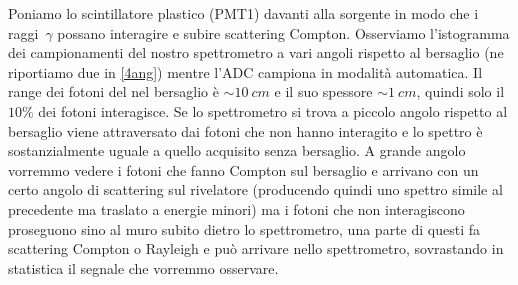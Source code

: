 Poniamo lo scintillatore plastico (PMT1) davanti alla sorgente in modo che i raggi~$\gamma$ possano interagire e subire scattering Compton. Osserviamo l'istogramma dei campionamenti del nostro spettrometro a vari angoli rispetto al bersaglio (ne riportiamo due in \autoref{4ang}) mentre l'ADC campiona in modalità automatica.
Il range dei fotoni del \co\; nel bersaglio è $\sim\SI{10}{cm}$ e il suo spessore $\sim\SI{1}{cm}$, quindi solo il $10\%$ dei fotoni interagisce. 
Se lo spettrometro si trova a piccolo angolo rispetto al bersaglio viene attraversato dai fotoni che non hanno interagito e lo spettro è sostanzialmente uguale a quello acquisito senza bersaglio. A grande angolo vorremmo vedere i fotoni che fanno Compton sul bersaglio e arrivano con un certo angolo di scattering sul rivelatore (producendo quindi uno spettro simile al precedente ma traslato a energie minori) ma i fotoni che non interagiscono proseguono sino al muro subito dietro lo spettrometro, una parte di questi fa scattering Compton o Rayleigh e può arrivare nello spettrometro, sovrastando in statistica il segnale che vorremmo osservare.

